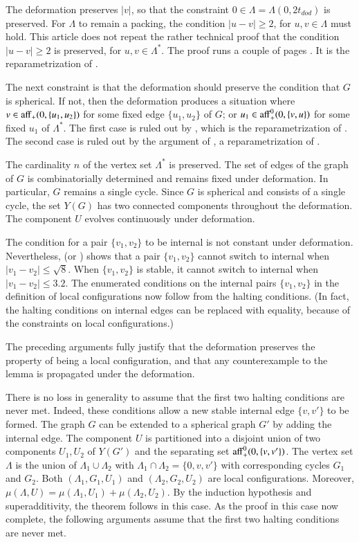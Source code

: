 \documentclass{article} %
\begin{document}
The deformation preserves $|v|$,
so that the constraint $0\in\Lambda=\Lambda(0,2t_{dod})$ is preserved.
For $\Lambda$ to remain a packing,  the condition
 $|u-v|\ge 2$, for $u,v\in \Lambda$ must hold.
This article does not repeat the rather technical proof that
the condition
 $|u-v|\ge 2$ is preserved, for $u,v\in\Lambda^*$.  The proof
runs a couple  of pages \cite[Lemma~7.6]{arx}.
It is the reparametrization of \cite[Lemma~12.20]{DCG}.

The next constraint is that the deformation should preserve the condition
that $G$ is spherical.  
If not, then the deformation produces
a situation where $v\in {\operatorname{aff}}_+(0,\{u_1,u_2\})$ for some fixed edge $\{u_1,u_2\}$
of $G$; or $u_1\in {\operatorname{aff}}_+^0(0,\{v,u\})$ for some fixed $u_1$ of $\Lambda^*$.
The first case is ruled out by \cite[Remark~p.22]{arx}, which is the reparametrization of \cite[\S12.7,p.132]{DCG}.  The second case is ruled out by 
the argument of \cite[p.27]{arx}, a reparametrization of 
\cite[\S12.8,p.134]{DCG}.

The cardinality $n$ of the vertex set $\Lambda^*$ is preserved.
The set of edges of the graph of $G$ is combinatorially determined and
remains fixed under deformation.  In particular, $G$ remains a single
cycle.  Since $G$ is spherical and consists of a single
cycle, the set $Y(G)$ has two connected components throughout the
deformation.  The component $U$ evolves continuously under deformation.   

The condition for a pair $\{v_1,v_2\}$ to be
internal is not constant under deformation.  Nevertheless,
\cite[p.23]{arx} (or \cite[p.132]{DCG}) 
shows that a pair $\{v_1,v_2\}$
cannot switch to internal when $|v_1-v_2| \le \sqrt8$.  When $\{v_1,v_2\}$ is stable,
it cannot switch to internal when $|v_1-v_2|\le 3.2$. 
The enumerated conditions on the
internal pairs $\{v_1,v_2\}$ in the definition of local configurations
now follow from the halting conditions. (In fact, the halting conditions on internal edges
can be replaced with equality, because of the
constraints on local configurations.)

The preceding arguments fully justify that the deformation preserves
the property of being a local configuration, and that
any counterexample to the lemma is propagated under
the deformation.


There is no loss in generality to assume that the first two halting conditions are never
met.  Indeed, these conditions allow a new stable internal edge $\{v,v'\}$ to be formed.  The
graph $G$ can be extended to a spherical graph $G'$ by adding the internal edge.
The component $U$ is partitioned into a disjoint union of two components $U_1,U_2$ 
of $Y(G')$ and the separating set ${\operatorname{aff}}_+^0(0,\{v,v'\})$.  The vertex set
$\Lambda$ is the union of $\Lambda_1\cup\Lambda_2$ with $\Lambda_1\cap\Lambda_2=\{0,v,v'\}$
with corresponding cycles $G_1$ and $G_2$.  Both $(\Lambda_1,G_1,U_1)$ and $(\Lambda_2,G_2,U_2)$ are local configurations.  Moreover, $\mu(\Lambda,U) = \mu(\Lambda_1,U_1)+\mu(\Lambda_2,U_2)$.  By the induction hypothesis and superadditivity, the theorem follows in this case.
As the proof in this case now complete, the following arguments
assume that the first two halting conditions are never met.
\end{document}
